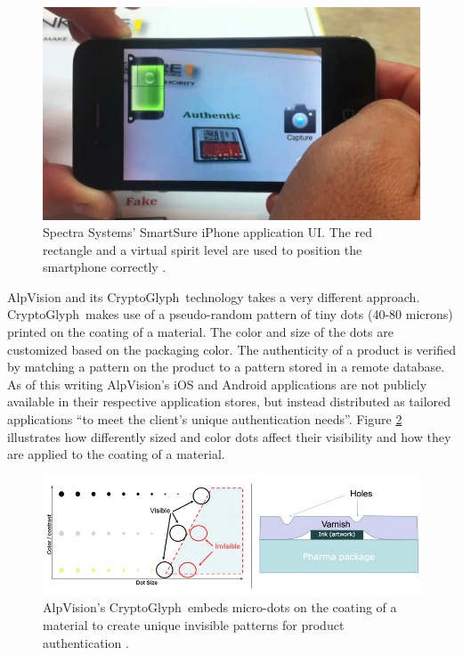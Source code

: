 \documentclass[thesis.tex]{subfiles}
\begin{document}
\begin{figure}[ht]
\centering \includegraphics[width=13.25cm]{images/existing_solutions/smartsure}
\caption{Spectra Systems' SmartSure iPhone application UI. The red rectangle and a virtual spirit level are used to position the smartphone correctly \cite{inksure}. \label{figure:inksure}}
\end{figure}

AlpVision and its CryptoGlyph\textregistered\ technology takes a very different approach. CryptoGlyph\textregistered\ makes use of a pseudo-random pattern of tiny dots (40-80 microns) printed on the coating of a material. The color and size of the dots are customized based on the packaging color. The authenticity of a product is verified by matching a pattern on the product to a pattern stored in a remote database. As of this writing AlpVision's iOS and Android applications are not publicly available in their respective application stores, but instead distributed as tailored applications ``to meet the client's unique authentication needs''. Figure \ref{figure:alpvision} illustrates how differently sized and color dots affect their visibility and how they are applied to the coating of a material. \cite{alpvision}

\begin{figure}[hb]
\centering \includegraphics[width=\textwidth]{images/existing_solutions/cryptoglyph}
\caption{AlpVision's CryptoGlyph\textregistered\ embeds micro-dots on the coating of a material to create unique invisible patterns for product authentication \cite{alpvision}. \label{figure:alpvision}}
\end{figure}
\end{document}
